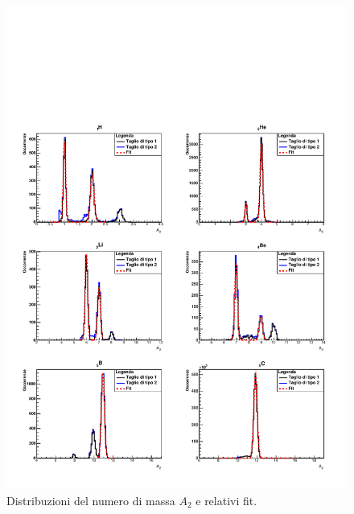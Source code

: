 \documentclass[12pt,a4paper,twoside]{report}
\begin{document}
	\begin{figure}[H]
		\centering
		\includegraphics[width=0.98\linewidth]{c_Total_black_blue2.pdf}
		\caption{Distribuzioni del numero di massa $A_2$ e relativi fit.}
		\label{fig:a2_fragments_final}
	\end{figure}
\end{document}
